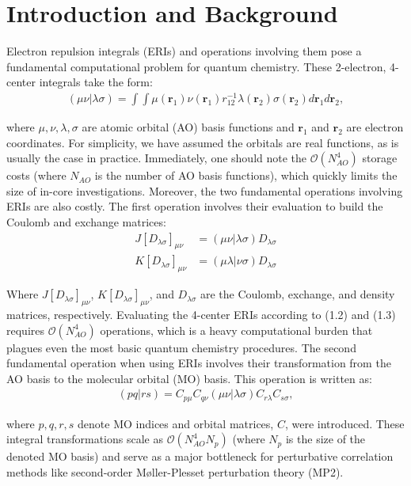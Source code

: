 \chapter{Introduction and Background}

Electron repulsion integrals (ERIs) and operations involving them pose a fundamental
computational problem for quantum chemistry. These 2-electron, 4-center integrals take the form:
\begin{align}(\mu \nu | \lambda \sigma) = \int \int \mu(\textbf{r}_{1}) 
\nu(\textbf{r}_{1}) r^{-1}_{12} \lambda(\textbf{r}_{2}) \sigma(\textbf{r}_{2}) 
d{\textbf{r}_{1}}d{\textbf{r}_{2}},
\end{align}

\noindent where $\mu, \nu, \lambda, \sigma$ are atomic orbital (AO) basis functions and $\textbf{r}_{1}$ and $\textbf{r}_{2}$
are electron coordinates. For simplicity, we have assumed the orbitals are real functions, as is usually
the case in practice. Immediately, one should note the $\mathcal{O}(N_{AO}^4)$ storage costs (where $N_{AO}$ is
the number of AO basis functions), which quickly 
limits the size of in-core investigations. Moreover, the two fundamental operations involving ERIs 
are also costly. The first operation involves their evaluation to build the Coulomb and exchange matrices:
\begin{align}
J[D_{\lambda \sigma}]_{\mu \nu} &= (\mu \nu|\lambda \sigma)D_{\lambda \sigma} \\
K[D_{\lambda \sigma}]_{\mu \nu} &= (\mu \lambda|\nu \sigma)D_{\lambda \sigma}
\end{align}

\noindent Where $J[D_{\lambda \sigma}]_{\mu \nu}$, $K[D_{\lambda \sigma}]_{\mu \nu}$, 
and $D_{\lambda \sigma}$ are the Coulomb, exchange, and density matrices, respectively.
Evaluating the 4-center ERIs according to (1.2) and (1.3) requires $\mathcal{O}(N_{AO}^4)$ operations, 
which is a heavy computational burden that plagues even the most basic quantum chemistry procedures. 
The second fundamental operation when using ERIs involves their transformation from the AO basis 
to the molecular orbital (MO) basis. This operation is written as:
\begin{align}
(pq | rs) = C_{p \mu}C_{q \nu}
(\mu \nu | \lambda \sigma)C_{r\lambda}C_{s\sigma},
\end{align} 

\noindent where $p,q,r,s$ denote MO indices and orbital matrices, $C$, were introduced. These integral transformations scale 
as $\mathcal{O}(N_{AO}^4N_p)$ (where $N_p$ is the size of the denoted MO basis) and serve as a major 
bottleneck for perturbative correlation methods like second-order M{\o}ller-Plesset perturbation theory (MP2).

